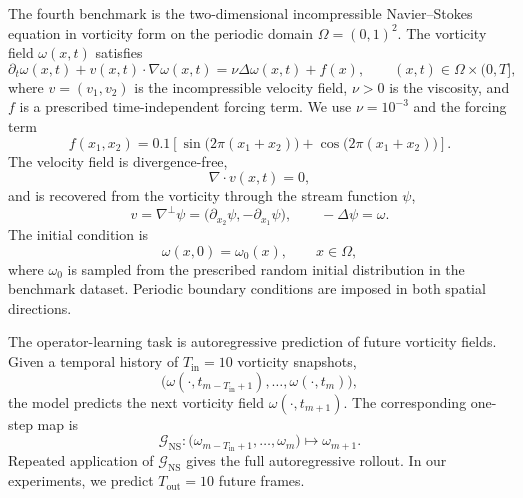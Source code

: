 \documentclass{article}
\begin{document}
The fourth benchmark is the two-dimensional incompressible Navier--Stokes equation in vorticity form on the periodic domain $\Omega=(0,1)^2$. 
The vorticity field $\omega(x,t)$ satisfies
\begin{equation}
    \partial_t \omega(x,t)
    +
    v(x,t)\cdot\nabla \omega(x,t)
    =
    \nu \Delta \omega(x,t)
    +
    f(x),
    \qquad
    (x,t)\in \Omega\times(0,T],
    \label{eq:app-ns-vorticity}
\end{equation}
where $v=(v_1,v_2)$ is the incompressible velocity field, $\nu>0$ is the viscosity, and $f$ is a prescribed time-independent forcing term. We use $\nu = 10^{-3}$ and the forcing term
\begin{equation}
    f(x_1,x_2)
    =
    0.1\left[
    \sin\big(2\pi(x_1+x_2)\big)
    +
    \cos\big(2\pi(x_1+x_2)\big)
    \right].
    \label{eq:app-ns-forcing}
\end{equation}
The velocity field is divergence-free,
\begin{equation}
    \nabla\cdot v(x,t)=0,
    \label{eq:app-ns-incompressible}
\end{equation}
and is recovered from the vorticity through the stream function $\psi$,
\begin{equation}
    v = \nabla^\perp \psi
    =
    \big(\partial_{x_2}\psi,-\partial_{x_1}\psi\big),
    \qquad
    -\Delta \psi = \omega.
    \label{eq:app-ns-stream}
\end{equation}
The initial condition is
\begin{equation}
    \omega(x,0)=\omega_0(x),
    \qquad x\in\Omega,
    \label{eq:app-ns-ic}
\end{equation}
where $\omega_0$ is sampled from the prescribed random initial distribution in the benchmark dataset. 
Periodic boundary conditions are imposed in both spatial directions.

The operator-learning task is autoregressive prediction of future vorticity fields. 
Given a temporal history of $T_{\mathrm{in}}=10$ vorticity snapshots,
\begin{equation}
    \big(
    \omega(\cdot,t_{m-T_{\mathrm{in}}+1}),
    \ldots,
    \omega(\cdot,t_m)
    \big),
\end{equation}
the model predicts the next vorticity field $\omega(\cdot,t_{m+1})$. 
The corresponding one-step map is
\begin{equation}
    \mathcal{G}_{\mathrm{NS}}:
    \big(
    \omega_{m-T_{\mathrm{in}}+1},
    \ldots,
    \omega_m
    \big)
    \mapsto
    \omega_{m+1}.
    \label{eq:app-ns-map}
\end{equation}
Repeated application of $\mathcal{G}_{\mathrm{NS}}$ gives the full autoregressive rollout. 
In our experiments, we predict $T_{\mathrm{out}}=10$ future frames.
\end{document}
